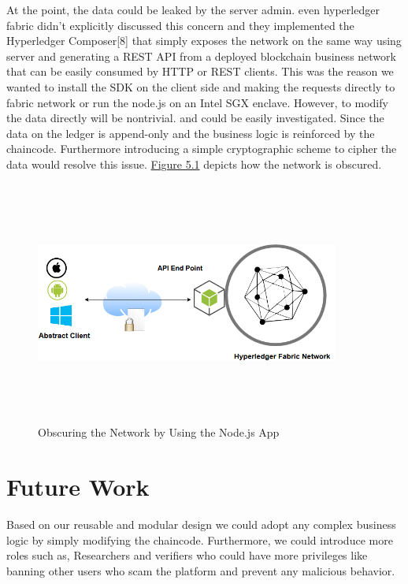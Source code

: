 At the point, the data could be leaked by the server admin. even hyperledger fabric didn't explicitly discussed this concern and they implemented the Hyperledger Composer[8] that simply exposes the network on the same way using server and generating a REST API from a deployed blockchain business network that can be easily consumed by HTTP or REST clients.
This was the reason we wanted to install the SDK on the client side and making the requests directly to fabric network or run the node.js on an Intel SGX enclave. 
 However, to modify the data directly will be nontrivial. and could be easily investigated. Since the data on the ledger is append-only and the business logic is reinforced by the chaincode. Furthermore introducing a simple cryptographic scheme to cipher the data would resolve this issue. 
\hyperref[fig:enrollmentproc]{Figure 5.1} depicts how the network is obscured.  
\ \\
 \begin{figure}[H]
\center
\includegraphics[width=10cm,height=8cm]{images/issues.png}
\caption{Obscuring the Network by Using the Node.js App }
\label{fig:issues}
\end{figure}

\section{Future Work} 

Based on our reusable and modular design we could adopt any complex business logic by simply modifying the chaincode. Furthermore, we could introduce more roles such as, Researchers and verifiers who could have more privileges like banning other users who scam the platform and prevent any malicious behavior. 
 
